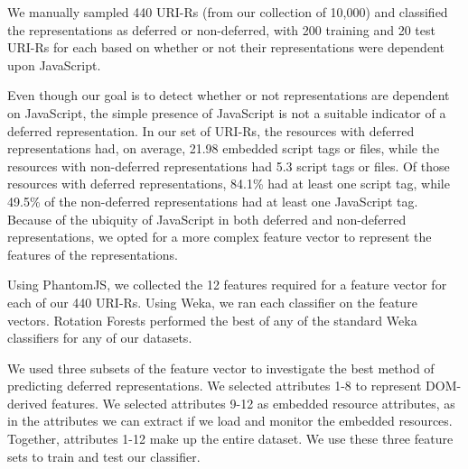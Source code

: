 \documentclass{ipres_proc_article-sp}
\begin{document}
We manually sampled 440 URI-Rs (from our collection of 10,000) and classified the representations as deferred or non-deferred, with 200 training and 20 test URI-Rs for each based on whether or not their representations were dependent upon JavaScript. 


Even though our goal is to detect whether or not representations are dependent on JavaScript, the simple presence of JavaScript is not a suitable indicator of a deferred representation. In our set of URI-Rs, the resources with deferred representations had, on average, 21.98 embedded script tags or files, while the resources with non-deferred representations had 5.3 script tags or files. Of those resources with deferred representations, 84.1\% had at least one script tag, while 49.5\% of the non-deferred representations had at least one JavaScript tag. Because of the ubiquity of JavaScript in both deferred and non-deferred representations, we opted for a more complex feature vector to represent the features of the representations.

Using PhantomJS, we collected the 12 features required for a feature vector for each of our 440 URI-Rs. Using Weka, we ran each classifier on the feature vectors. Rotation Forests \cite{rotationforest} performed the best of any of the standard Weka classifiers for any of our datasets.


We used three subsets of the feature vector to investigate the best method of predicting deferred representations. We selected attributes 1-8 to represent DOM-derived features. We selected attributes 9-12 as embedded resource attributes, as in the attributes we can extract if we load and monitor the embedded resources. Together, attributes 1-12 make up the entire dataset. We use these three feature sets to train and test our classifier. 
\end{document}
